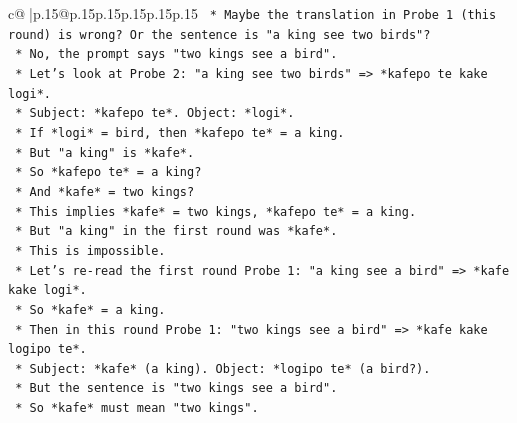 \documentclass{article}
\begin{document}
{\begin{supertabular}{c@{$\;$}|p{.15\linewidth}@{}p{.15\linewidth}p{.15\linewidth}p{.15\linewidth}p{.15\linewidth}p{.15\linewidth}}
{{{\texttt{                                                *   Maybe the translation in Probe 1 (this round) is wrong? Or the sentence is "a king see two birds"?} \\
\texttt{                                                *   No, the prompt says "two kings see a bird".} \\
\texttt{                                                *   Let's look at Probe 2: "a king see two birds" => *kafepo te kake logi*.} \\
\texttt{                                                    *   Subject: *kafepo te*. Object: *logi*.} \\
\texttt{                                                    *   If *logi* = bird, then *kafepo te* = a king.} \\
\texttt{                                                    *   But "a king" is *kafe*.} \\
\texttt{                                                    *   So *kafepo te* = a king?} \\
\texttt{                                                    *   And *kafe* = two kings?} \\
\texttt{                                                    *   This implies *kafe* = two kings, *kafepo te* = a king.} \\
\texttt{                                                    *   But "a king" in the first round was *kafe*.} \\
\texttt{                                                    *   This is impossible.} \\
\texttt{                                                    *   Let's re{-}read the first round Probe 1: "a king see a bird" => *kafe kake logi*.} \\
\texttt{                                                    *   So *kafe* = a king.} \\
\texttt{                                                    *   Then in this round Probe 1: "two kings see a bird" => *kafe kake logipo te*.} \\
\texttt{                                                        *   Subject: *kafe* (a king). Object: *logipo te* (a bird?).} \\
\texttt{                                                        *   But the sentence is "two kings see a bird".} \\
\texttt{                                                        *   So *kafe* must mean "two kings".} \\
}}}
\end{supertabular}}
\end{document}

